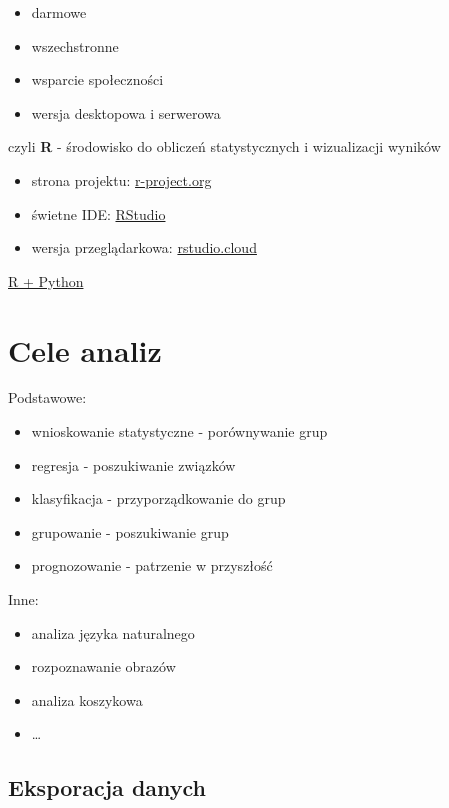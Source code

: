 \documentclass[]{book}
\providecommand{\tightlist}{%
  \setlength{\itemsep}{0pt}\setlength{\parskip}{0pt}}
\begin{document}
\begin{itemize}
\tightlist
\item
  darmowe
\item
  wszechstronne
\item
  wsparcie społeczności
\item
  wersja desktopowa i serwerowa
\end{itemize}

czyli \textbf{R} - środowisko do obliczeń statystycznych i wizualizacji
wyników

\begin{itemize}
\tightlist
\item
  strona projektu: \href{https://www.r-project.org/}{r-project.org}
\item
  świetne IDE: \href{https://www.rstudio.com/}{RStudio}
\item
  wersja przeglądarkowa: \href{https://rstudio.cloud/}{rstudio.cloud}
\end{itemize}

\href{https://www.business-science.io/business/2018/10/08/python-and-r.html}{R
+ Python}

\section{Cele analiz}\label{cele-analiz}

Podstawowe:

\begin{itemize}
\tightlist
\item
  wnioskowanie statystyczne - porównywanie grup
\item
  regresja - poszukiwanie związków
\item
  klasyfikacja - przyporządkowanie do grup
\item
  grupowanie - poszukiwanie grup
\item
  prognozowanie - patrzenie w przyszłość
\end{itemize}

Inne:

\begin{itemize}
\tightlist
\item
  analiza języka naturalnego
\item
  rozpoznawanie obrazów
\item
  analiza koszykowa
\item
  \ldots{}
\end{itemize}

\subsection{Eksporacja danych}\label{eksporacja-danych}
\end{document}
